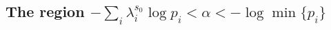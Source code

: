 \documentclass[12pt,]{article}
\newtheorem{theorem}{Theorem}[section]
\theoremstyle{definition}
\theoremstyle{remark}
\renewcommand{\Bbb}[1]{\mathbb{#1}}
\newcommand{\bbN}{{\Bbb N}}         %
\newcommand{\bbP}{{\Bbb P}}
\newcommand{\0}{\mathbf{0}}
\newcommand{\bi}{{\overline {\imath}}}
\newcommand{\bj}{{\overline  {\jmath}}}
\newcommand{\bo}{{\overline o}}
\begin{document}
%
%
%
%


\subsection{The region \texorpdfstring{$-\sum_i\lambda_i^{s_0}\log
p_i<\alpha<-\log\min\{p_i\}$}{intermediate probabilities}}\label{sec:lbver1}
\end{document}
